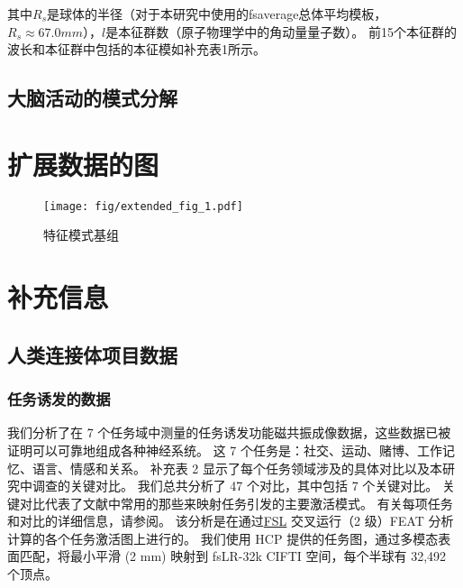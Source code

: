 \documentclass[lang=cn,a4paper,newtx]{elegantpaper}
\begin{document}
其中$R_s$是球体的半径（对于本研究中使用的fsaverage总体平均模板，$R_s \approx 67.0 mm$），$l$是本征群数（原子物理学中的角动量量子数）。
前15个本征群的波长和本征群中包括的本征模如补充表1所示。


\subsection{大脑活动的模式分解} \label{sec:modal_decomposition}





\section{扩展数据的图}


\begin{figure}[!htb] 
	\centering
	\texttt{[image: fig/extended\_fig\_1.pdf]}
	\caption{特征模式基组} \label{fig:extended_fig_1}
\end{figure}





\section{补充信息}

\subsection{人类连接体项目数据} \label{sec:sup_2}

\subsubsection{任务诱发的数据}

我们分析了在 7 个任务域中测量的任务诱发功能磁共振成像数据，这些数据已被证明可以可靠地组成各种神经系统\cite{barch2013function}。
这 7 个任务是：社交、运动、赌博、工作记忆、语言、情感和关系。
补充表 2 显示了每个任务领域涉及的具体对比以及本研究中调查的关键对比。
我们总共分析了 47 个对比，其中包括 7 个关键对比。
关键对比代表了文献中常用的那些来映射任务引发的主要激活模式。
有关每项任务和对比的详细信息，请参阅\cite{barch2013function}。
该分析是在通过\href{https://fsl.fmrib.ox.ac.uk/}{FSL} 交叉运行（2 级）FEAT 分析\cite{woolrich2004multilevel}计算的各个任务激活图上进行的。
我们使用 HCP 提供的任务图，通过多模态表面匹配\cite{robinson2018multimodal}，将最小平滑 (2 mm) 映射到 fsLR-32k CIFTI 空间，每个半球有 32,492 个顶点。
\end{document}
